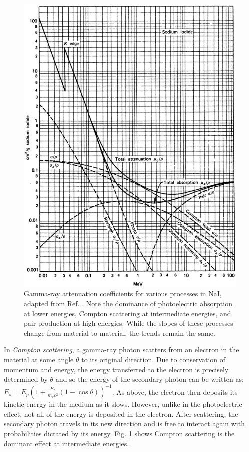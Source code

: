 \begin{figure}[hb!]
	\centerline{\includegraphics[height=0.7\textheight]{./img/c3/gamma_interactions_scan.eps}}
	\caption{Gamma-ray attenuation coefficients for various processes in NaI, adapted from Ref. \cite{knollBook}. Note the dominance of photoelectric absorption at lower energies, Compton scattering at intermediate energies, and pair production at high energies. While the slopes of these processes change from material to material, the trends remain the same.}
	\label{fig:chp3-gamma-interactions}
\end{figure}

In \emph{Compton scattering}, a gamma-ray photon scatters from an electron in the material at some angle $\theta$ to its original direction\cite{Compton-PhysRev.21.483}. Due to conservation of momentum and energy, the energy transferred to the electron is precisely determined by $\theta$ and so the energy of the secondary photon can be written as: $E_{s}=E_{p}(1+\frac{E_{p}}{m_{e}c^2}(1-\cos\theta))^{-1}$. As above, the electron then deposits its kinetic energy in the medium as it slows. However, unlike in the photoelectric effect, not all of the energy is deposited in the electron. After scattering, the secondary photon travels in its new direction and is free to interact again with probabilities dictated by its energy. Fig. \ref{fig:chp3-gamma-interactions} shows Compton scattering is the dominant effect at intermediate energies.

